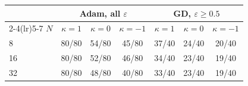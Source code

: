\begin{tabular}{@{}lcccccc@{}}
\toprule
 & \multicolumn{3}{c}{Adam, all $\varepsilon$} & \multicolumn{3}{c}{GD, $\varepsilon\ge0.5$}\\
\cmidrule(lr){2-4}\cmidrule(lr){5-7}
$N$ & $\kappa=1$ & $\kappa=0$ & $\kappa=-1$ & $\kappa=1$ & $\kappa=0$ & $\kappa=-1$\\
\midrule
8 & 80/80 & 54/80 & 45/80 & 37/40 & 24/40 & 20/40\\
16 & 80/80 & 52/80 & 46/80 & 34/40 & 23/40 & 19/40\\
32 & 80/80 & 48/80 & 40/80 & 33/40 & 23/40 & 19/40\\
\bottomrule
\end{tabular}
